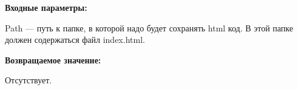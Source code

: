 \textbf{Входные параметры:}

Path --- путь к папке, в которой надо будет сохранять html код. В этой папке должен содержаться файл index.html.

\textbf{Возвращаемое значение:}

Отсутствует.